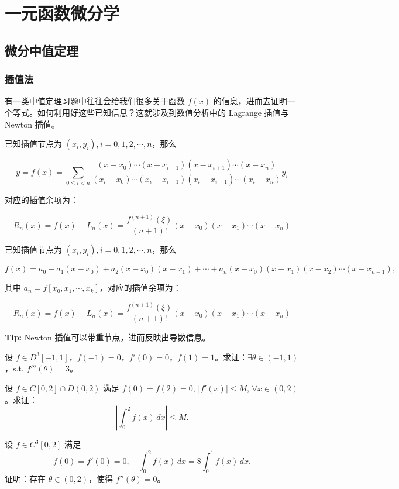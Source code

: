 \documentclass[lang=cn,10pt,thmcnt=section]{elegantbook}
\begin{document}
\chapter{一元函数微分学}
\section{微分中值定理}
\subsection{插值法}
有一类中值定理习题中往往会给我们很多关于函数 $f(x)$ 的信息，进而去证明一个等式。如何利用好这些已知信息？这就涉及到数值分析中的 Lagrange 插值与 Newton 插值。
\begin{theorem}[Lagrange 插值]
	已知插值节点为 $(x_i, y_i), i = 0, 1, 2, \cdots, n$，那么

\[ y = f(x) = \sum_{0 \leq i < n} \frac{(x - x_0) \cdots (x - x_{i-1})(x - x_{i+1}) \cdots (x - x_n)}{(x_i - x_0) \cdots (x_i - x_{i-1})(x_i - x_{i+1}) \cdots (x_i - x_n)} y_i \]

对应的插值余项为：

\[ R_n(x) = f(x) - L_n(x) = \frac{f^{(n+1)}(\xi)}{(n+1)!}(x - x_0)(x - x_1) \cdots (x - x_n) \]

\end{theorem}
\begin{theorem}[Newton 插值]
	已知插值节点为 $(x_i, y_i), i = 0, 1, 2, \cdots, n$，那么

\[ f(x) = a_0 + a_1(x - x_0) + a_2(x - x_0)(x - x_1) + \cdots + a_n(x - x_0)(x - x_1)(x - x_2) \cdots (x - x_{n-1}), \]

其中 $a_n = f[x_0, x_1, \cdots, x_k]$，对应的插值余项为：

\[ R_n(x) = f(x) - L_n(x) = \frac{f^{(n+1)}(\xi)}{(n+1)!}(x - x_0)(x - x_1) \cdots (x - x_n) \]

\textbf{Tip:} Newton 插值可以带重节点，进而反映出导数信息。
\end{theorem}
\begin{example}
	设 $f \in D^3[-1, 1]$，$f(-1) = 0$，$f'(0) = 0$，$f(1) = 1$。求证：$\exists \theta \in (-1, 1)$，s.t. $f'''(\theta) = 3$。
\end{example}
\begin{example}
	设 \(f \in C[0, 2] \cap D(0, 2)\) 满足 \(f(0) = f(2) = 0\), \(|f'(x)| \leq M\), \(\forall x \in (0, 2)\)。求证：
\[ \left| \int_{0}^{2} f(x) \, dx \right| \leq M. \]
\end{example}
\begin{example}
	设 \( f \in C^3[0,2] \) 满足
\[ f(0) = f'(0) = 0, \quad \int_{0}^{2} f(x) \, dx = 8 \int_{0}^{1} f(x) \, dx. \]
证明：存在 \( \theta \in (0,2) \)，使得 \( f''(\theta) = 0 \)。
\end{example}
\end{document}
